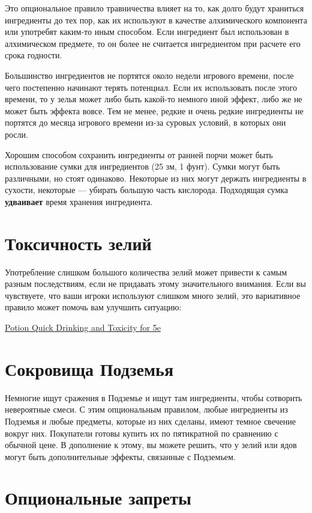 \documentclass[a4paper, 9pt, twocolumn]{book}
\begin{document}
	Это опциональное правило травничества влияет на то, как долго будут храниться ингредиенты до тех пор, как их используют в качестве алхимического компонента или употребят каким-то иным способом. Если ингредиент был использован в алхимическом предмете, то он более не считается ингредиентом при расчете его срока годности.
	
	Большинство ингредиентов не портятся около недели игрового времени, после чего постепенно начинают терять потенциал. Если их использовать после этого времени, то у зелья может либо быть какой-то немного иной эффект, либо же не может быть эффекта вовсе. Тем не менее, редкие и очень редкие ингредиенты не портятся до месяца игрового времени из-за суровых условий, в которых они росли.
	
	Хорошим способом сохранить ингредиенты от ранней порчи может быть использование сумки для ингредиентов (25 зм, 1 фунт). Сумки могут быть различными, но стоят одинаково. Некоторые из них могут держать ингредиенты в сухости, некоторые --- убирать большую часть кислорода. Подходящая сумка \textbf{удваивает} время хранения ингредиента.
	
	\section{Токсичность зелий}
	
	Употребление слишком большого количества зелий может привести к самым разным последствиям, если не придавать этому значительного внимания. Если вы чувствуете, что ваши игроки используют слишком много зелий, это вариативное правило может помочь вам улучшить ситуацию: 
	
	\href{https://homebrewery.naturalcrit.com/share/n1MAVZSD}{Potion Quick Drinking and Toxicity for 5e}	
	
	\section{Сокровища Подземья}
	
	Немногие ищут сражения в Подземье и ищут там ингредиенты, чтобы сотворить невероятные смеси. С этим опциональным правилом, любые ингредиенты из Подземья и любые предметы, которые из них сделаны, имеют темное свечение вокруг них. Покупатели готовы купить их по пятикратной по сравнению с обычной цене. В дополнение к этому, вы можете решить, что у зелий или ядов могут быть дополнительные эффекты, связанные с Подземьем.
	
	\section{Опциональные запреты}
	
\end{document}
